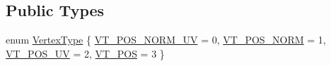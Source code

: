 \subsection*{Public Types}
\begin{CompactItemize}
\item 
enum \hyperlink{class_hydrax_1_1_mesh_5409dc682ec836d1922dc193fc1bf559}{VertexType} \{ \hyperlink{class_hydrax_1_1_mesh_5409dc682ec836d1922dc193fc1bf5593d65f4098434f3f25641f85a0111ac59}{VT\_\-POS\_\-NORM\_\-UV} =  0, 
\hyperlink{class_hydrax_1_1_mesh_5409dc682ec836d1922dc193fc1bf559e0bde602e4da55d9666aa27826eadb62}{VT\_\-POS\_\-NORM} =  1, 
\hyperlink{class_hydrax_1_1_mesh_5409dc682ec836d1922dc193fc1bf559d3eaa954d9867e0116978459c071dd15}{VT\_\-POS\_\-UV} =  2, 
\hyperlink{class_hydrax_1_1_mesh_5409dc682ec836d1922dc193fc1bf559e340a2bac49ecd07b48fe0996c3783eb}{VT\_\-POS} =  3
 \}

\end{CompactItemize}
